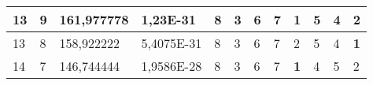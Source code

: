 \documentclass[conference]{IEEEtran}
\begin{document}
\begin{table*}[]
\begin{tabular}{|llll|llllllll|}
\multicolumn{1}{|l|}{13}                                                    & \multicolumn{1}{l|}{9}                                                        & \multicolumn{1}{l|}{161,977778}                                                   & 1,23E-31                       & \multicolumn{1}{l|}{8}                                                  & \multicolumn{1}{l|}{3}                                                  & \multicolumn{1}{l|}{6}                                                  & \multicolumn{1}{l|}{7}                                                  & \multicolumn{1}{l|}{\textbf{1}}                                         & \multicolumn{1}{l|}{5}                                                  & \multicolumn{1}{l|}{4}                                                  & 2                          \\ \hline
\multicolumn{1}{|l|}{13}                                                    & \multicolumn{1}{l|}{8}                                                        & \multicolumn{1}{l|}{158,922222}                                                   & 5,4075E-31                     & \multicolumn{1}{l|}{8}                                                  & \multicolumn{1}{l|}{3}                                                  & \multicolumn{1}{l|}{6}                                                  & \multicolumn{1}{l|}{7}                                                  & \multicolumn{1}{l|}{2}                                                  & \multicolumn{1}{l|}{5}                                                  & \multicolumn{1}{l|}{4}                                                  & \textbf{1}                 \\ \hline
\multicolumn{1}{|l|}{14}                                                    & \multicolumn{1}{l|}{7}                                                        & \multicolumn{1}{l|}{146,744444}                                                   & 1,9586E-28                     & \multicolumn{1}{l|}{8}                                                  & \multicolumn{1}{l|}{3}                                                  & \multicolumn{1}{l|}{6}                                                  & \multicolumn{1}{l|}{7}                                                  & \multicolumn{1}{l|}{\textbf{1}}                                         & \multicolumn{1}{l|}{4}                                                  & \multicolumn{1}{l|}{5}                                                  & 2                          \\ \hline

\end{tabular}
\end{table*}
\end{document}
